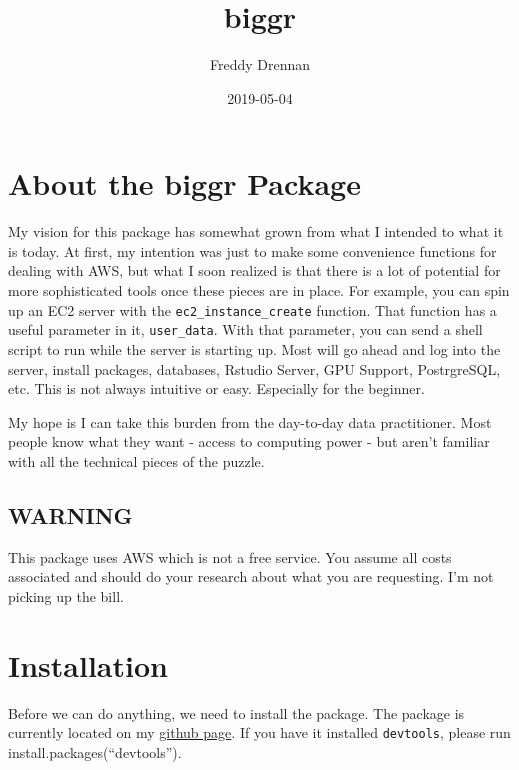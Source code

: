 \documentclass[]{book}
\title{biggr}
\author{Freddy Drennan}
\date{2019-05-04}
\begin{document}
\maketitle

{
\setcounter{tocdepth}{1}
\tableofcontents
}
\hypertarget{about-the-biggr-package}{%
\chapter{About the biggr Package}\label{about-the-biggr-package}}

My vision for this package has somewhat grown from what I intended to what it is today. At first, my intention was just to make some convenience functions for dealing with AWS, but what I soon realized is that there is a lot of potential for more sophisticated tools once these pieces are in place. For example, you can spin up an EC2 server with the \texttt{ec2\_instance\_create} function. That function has a useful parameter in it, \texttt{user\_data}. With that parameter, you can send a shell script to run while the server is starting up. Most will go ahead and log into the server, install packages, databases, Rstudio Server, GPU Support, PostrgreSQL, etc. This is not always intuitive or easy. Especially for the beginner.

My hope is I can take this burden from the day-to-day data practitioner. Most people know what they want - access to computing power - but aren't familiar with all the technical pieces of the puzzle.

\hypertarget{warning}{%
\section{WARNING}\label{warning}}

This package uses AWS which is not a free service. You assume all costs associated and should do your research about what you are requesting. I'm not picking up the bill.

\hypertarget{installation}{%
\chapter{Installation}\label{installation}}

Before we can do anything, we need to install the package. The package is currently located on my \href{https://github.com/fdrennan/biggr}{github page}. If you have it installed \texttt{devtools}, please run install.packages(``devtools'').
\end{document}
